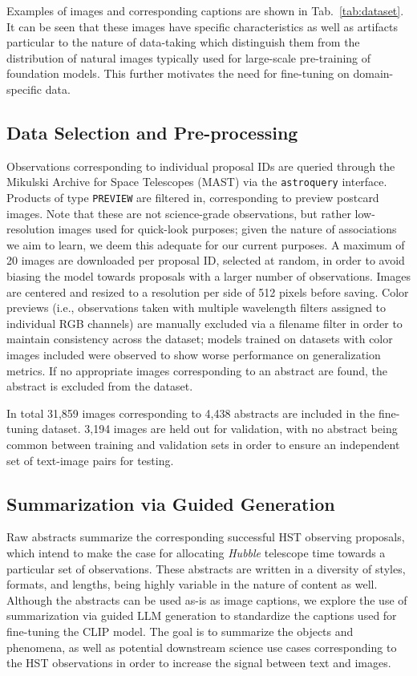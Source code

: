 \documentclass[10pt]{article} %
\newcommand{\hubble}{\emph{Hubble}\xspace}
\begin{document}
Examples of images and corresponding captions are shown in Tab.~\ref{tab:dataset}. It can be seen that these images have specific characteristics as well as artifacts particular to the nature of data-taking which distinguish them from the distribution of natural images typically used for large-scale pre-training of foundation models. This further motivates the need for fine-tuning on domain-specific data.

\subsection{Data Selection and Pre-processing}

Observations corresponding to individual proposal IDs are queried through the Mikulski Archive for Space Telescopes (MAST) via the \texttt{astroquery} interface. Products of type \texttt{PREVIEW} are filtered in, corresponding to preview postcard images. Note that these are not science-grade observations, but rather low-resolution images used for quick-look purposes; given the nature of associations we aim to learn, we deem this adequate for our current purposes. A maximum of 20 images are downloaded per proposal ID, selected at random, in order to avoid biasing the model towards proposals with a larger number of observations. Images are centered and resized to a resolution per side of 512 pixels before saving. Color previews (i.e., observations taken with multiple wavelength filters assigned to individual RGB channels) are manually excluded via a filename filter in order to maintain consistency across the dataset; models trained on datasets with color images included were observed to show worse performance on generalization metrics. If no appropriate images corresponding to an abstract are found, the abstract is excluded from the dataset.

In total 31,859 images corresponding to 4,438 abstracts are included in the fine-tuning dataset. 3,194 images are held out for validation, with no abstract being common between training and validation sets in order to ensure an independent set of text-image pairs for testing.


\subsection{Summarization via Guided Generation}
\label{sec:summarization}

Raw abstracts summarize the corresponding successful HST observing proposals, which intend to make the case for allocating \hubble telescope time towards a particular set of observations. These abstracts are written in a diversity of styles, formats, and lengths, being highly variable in the nature of content as well. Although the abstracts can be used as-is as image captions, we explore the use of summarization via guided LLM generation to standardize the captions used for fine-tuning the CLIP model. The goal is to summarize the objects and phenomena, as well as potential downstream science use cases corresponding to the HST observations in order to increase the signal between text and images.
\end{document}
